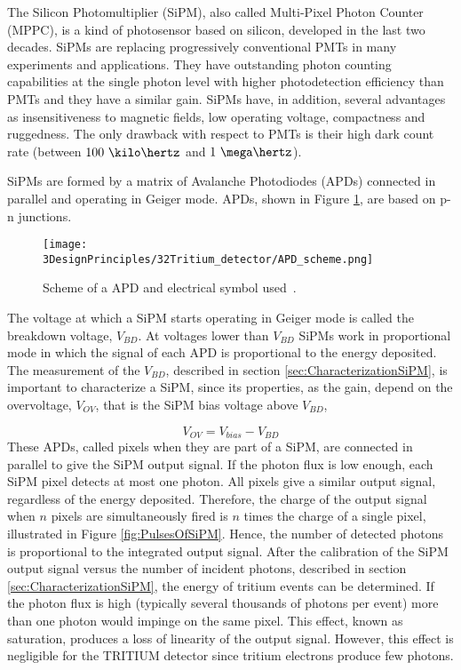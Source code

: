 The Silicon Photomultiplier (SiPM), also called Multi-Pixel Photon Counter (MPPC), is a kind of photosensor based on silicon, developed in the last two decades. SiPMs are replacing progressively conventional PMTs in many experiments and applications. They have outstanding photon counting capabilities at the single photon level with higher photodetection efficiency than PMTs and they have a similar gain. SiPMs have, in addition, several advantages as insensitiveness to magnetic fields, low operating voltage, compactness and ruggedness. The only drawback with respect to PMTs is their high dark count rate (between $100~\kilo\hertz$ and $1~\mega\hertz$).

SiPMs are formed by a matrix of Avalanche Photodiodes (APDs) connected in parallel and operating in Geiger mode. APDs, shown in Figure \ref{fig:SchemeAPD}, are based on p-n junctions. %

\begin{figure}[htbp]
\centering
\texttt{[image: 3DesignPrinciples/32Tritium\_detector/APD\_scheme.png]}
\caption{Scheme of a APD and electrical symbol used\label{fig:SchemeAPD}~\cite{OSI}.}
\end{figure}
 The voltage at which a SiPM starts operating in Geiger mode is called the breakdown voltage, $V_ {BD}$. At voltages lower than $V_ {BD}$ SiPMs work in proportional mode in which the signal of each APD is proportional to the energy deposited. The measurement of the $V_ {BD}$, described in section \ref{sec:CharacterizationSiPM}, is important to characterize a SiPM, since its properties, as the gain, depend on the overvoltage, $V_{OV}$, that is the SiPM bias voltage above $V_ {BD}$,

\begin{equation}
V_{OV}=V_{bias}-V_{BD}
\label{overvoltage}
\end{equation}
These APDs, called pixels when they are part of a SiPM, are connected in parallel to give the SiPM output signal. If the photon flux is low enough, each SiPM pixel detects at most one photon. All pixels give a similar output signal, regardless of the energy deposited. Therefore, the charge of the output signal when $n$ pixels are simultaneously fired is $n$ times the charge of a single pixel, illustrated in Figure \ref{fig:PulsesOfSiPM}. Hence, the number of detected photons is proportional to the integrated output signal. After the calibration of the SiPM output signal versus the number of incident photons, described in section \ref{sec:CharacterizationSiPM}, the energy of tritium events can be determined. If the photon flux is high (typically several thousands of photons per event) more than one photon would impinge on the same pixel. This effect, known as saturation, produces a loss of linearity of the output signal. However, this effect is negligible for the TRITIUM detector since tritium electrons produce few photons. %

